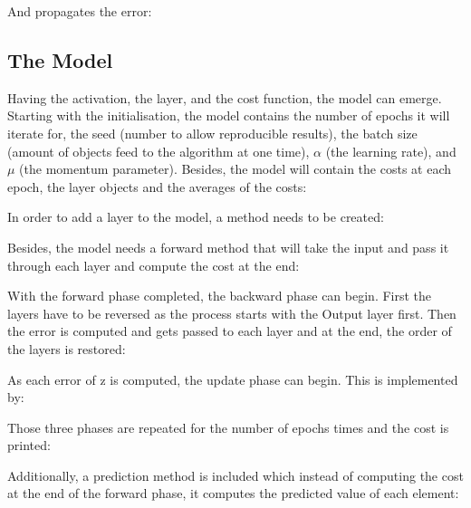 \documentclass{report}
\begin{document}


And propagates the error:




\subsection{The Model}

Having the activation, the layer, and the cost function, the model can emerge. Starting with the initialisation, the model contains the number of epochs it will iterate for, the seed (number to allow reproducible results), the batch size (amount of objects feed to the algorithm at one time), $\alpha$ (the learning rate), and $\mu$ (the momentum parameter). Besides, the model will contain the costs at each epoch, the layer objects and the averages of the costs:



In order to add a layer to the model, a method needs to be created:



Besides, the model needs a forward method that will take the input and pass it through each layer and compute the cost at the end:



With the forward phase completed, the backward phase can begin. First the layers have to be reversed as the process starts with the Output layer first. Then the error is computed and gets passed to each layer and at the end, the order of the layers is restored:



As each error of z is computed, the update phase can begin. This is implemented by:



Those three phases are repeated for the number of epochs times and the cost is printed:



Additionally, a prediction method is included which instead of computing the cost at the end of the forward phase, it computes the predicted value of each element:
\end{document}
